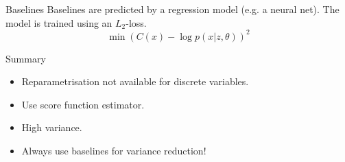 \begin{frame}{Baselines}
Baselines are predicted by a regression model (e.g. a neural net). The model is trained using 
an $ L_{2} $-loss.
\begin{equation*}
\min \left(C(x) - \log p(x|z,\theta)\right)^{2}
\end{equation*}
\end{frame}

\begin{frame}{Summary}
\begin{itemize}
\pause
\item Reparametrisation not available for discrete variables.
\pause
\item Use score function estimator.
\pause
\item High variance.
\pause
\item Always use baselines for variance reduction!
\end{itemize}
\end{frame}
